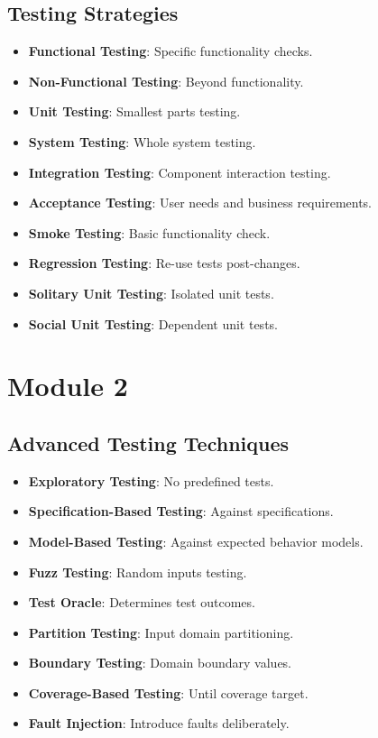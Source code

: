 \documentclass[10pt,portrait]{article}
\begin{document}
\begin{multicols}{ 2 }
\subsection{Testing Strategies}
\begin{itemize}
    \item \textbf{Functional Testing}: Specific functionality checks.
    \item \textbf{Non-Functional Testing}: Beyond functionality.
    \item \textbf{Unit Testing}: Smallest parts testing.
    \item \textbf{System Testing}: Whole system testing.
    \item \textbf{Integration Testing}: Component interaction testing.
    \item \textbf{Acceptance Testing}: User needs and business requirements.
    \item \textbf{Smoke Testing}: Basic functionality check.
    \item \textbf{Regression Testing}: Re-use tests post-changes.
    \item \textbf{Solitary Unit Testing}: Isolated unit tests.
    \item \textbf{Social Unit Testing}: Dependent unit tests.
\end{itemize}

\section{Module 2}

\subsection{Advanced Testing Techniques}
\begin{itemize}
    \item \textbf{Exploratory Testing}: No predefined tests.
    \item \textbf{Specification-Based Testing}: Against specifications.
    \item \textbf{Model-Based Testing}: Against expected behavior models.
    \item \textbf{Fuzz Testing}: Random inputs testing.
    \item \textbf{Test Oracle}: Determines test outcomes.
    \item \textbf{Partition Testing}: Input domain partitioning.
    \item \textbf{Boundary Testing}: Domain boundary values.
    \item \textbf{Coverage-Based Testing}: Until coverage target.
    \item \textbf{Fault Injection}: Introduce faults deliberately.
\end{itemize}


\end{multicols}
\end{document}

